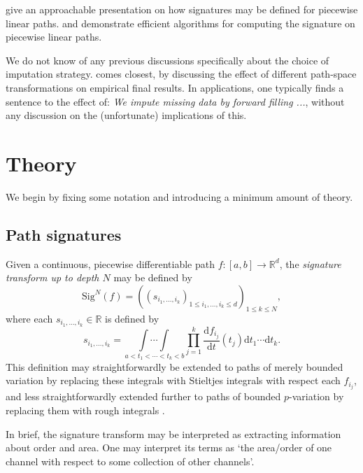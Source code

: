 \documentclass{article}
\newcommand{\reals}{\mathbb{R}}
\newcommand{\sig}{\mathrm{Sig}^N}
\begin{document}
\citet[Appendix A]{kidger2019deep} give an approachable presentation on how signatures may be defined for piecewise linear paths. \citet{iisignature} and \citet{signatory} demonstrate efficient algorithms for computing the signature on piecewise linear paths.%

We do not know of any previous discussions specifically about the choice of imputation strategy. \citet{fermanian2019embedding} comes closest, by discussing the effect of different path-space transformations on empirical final results. In applications, one typically finds a sentence to the effect of: \emph{We impute missing data by forward filling ...}, without any discussion on the (unfortunate) implications of this.

\section{Theory}
We begin by fixing some notation and introducing a minimum amount of theory.

\subsection{Path signatures}
Given a continuous, piecewise differentiable path $f \colon [a, b] \to \reals^d$, the \emph{signature transform up to depth $N$} may be defined by
\begin{equation*}
    \sig(f)=\left(\left(s_{i_1, \ldots, i_k}\right)_{1 \leq i_{1}, \ldots, i_{k} \leq d}\right)_{1 \leq k \leq N},
\end{equation*}
where each $s_{i_1, \ldots, i_k} \in \reals$ is defined by
\begin{equation}\label{eq:signature}
    s_{i_1, \ldots, i_k} = \underset{\,a<t_{1}<\cdots<t_{k}<b}{\int \cdots \int} \prod_{j=1}^{k} \frac{\mathrm{d} f_{i_{j}}}{\mathrm{d} t}\left(t_{j}\right) \mathrm{d} t_{1} \cdots \mathrm{d} t_{k}.
\end{equation}
This definition may straightforwardly be extended to paths of merely bounded variation by replacing these integrals with Stieltjes integrals with respect each $f_{i_j}$, and less straightforwardly extended further to paths of bounded $p$-variation by replacing them with rough integrals \citep{lyons1998differential}.

In brief, the signature transform may be interpreted as extracting information about order and area. One may interpret its terms as `the area/order of one channel with respect to some collection of other channels'.
\end{document}
